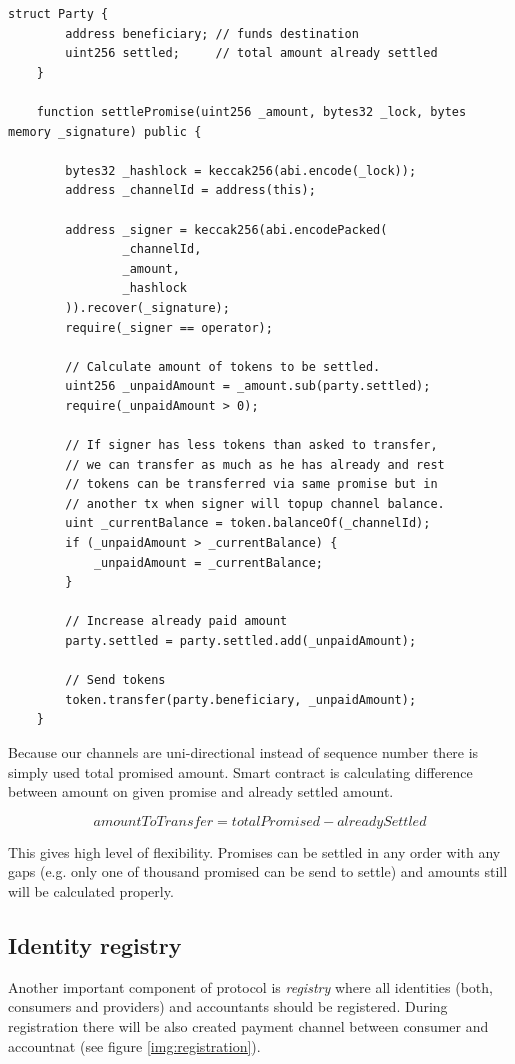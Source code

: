 \documentclass[a4paper,12pt]{article}
\begin{document}
\begin{lstlisting}[language=Solidity]
    struct Party {
        address beneficiary; // funds destination
        uint256 settled;     // total amount already settled
    }

    function settlePromise(uint256 _amount, bytes32 _lock, bytes memory _signature) public {

        bytes32 _hashlock = keccak256(abi.encode(_lock));
        address _channelId = address(this);

        address _signer = keccak256(abi.encodePacked(
                _channelId, 
                _amount, 
                _hashlock
        )).recover(_signature);
        require(_signer == operator);

        // Calculate amount of tokens to be settled.
        uint256 _unpaidAmount = _amount.sub(party.settled);
        require(_unpaidAmount > 0);

        // If signer has less tokens than asked to transfer, 
        // we can transfer as much as he has already and rest 
        // tokens can be transferred via same promise but in 
        // another tx when signer will topup channel balance.
        uint _currentBalance = token.balanceOf(_channelId);
        if (_unpaidAmount > _currentBalance) {
            _unpaidAmount = _currentBalance;
        }

        // Increase already paid amount
        party.settled = party.settled.add(_unpaidAmount);

        // Send tokens
        token.transfer(party.beneficiary, _unpaidAmount);
    }
\end{lstlisting}

Because our channels are uni-directional instead of sequence number there is 
simply used total promised amount. Smart contract is calculating difference 
between amount on given promise and already settled amount.

\[ amountToTransfer = totalPromised - alreadySettled \]

This gives high level of flexibility. Promises can be settled in any order with
any gaps (e.g. only one of thousand promised can be send to settle) and amounts 
still will be calculated properly.

\subsection{Identity registry}

Another important component of protocol is \textit{registry} where all 
identities (both, consumers and providers) and accountants should be registered. 
During registration there will be also created payment channel between consumer 
and accountnat (see figure \ref{img:registration}).
\end{document}
